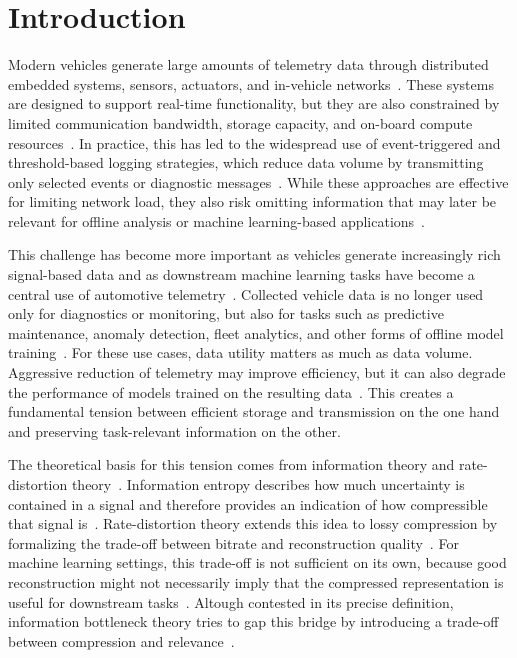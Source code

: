 \chapter{Introduction}
\label{chap:introduction}

Modern vehicles generate large amounts of telemetry data through distributed embedded systems, sensors, actuators, and in-vehicle networks~\cite{Lee2017,Navet2009,MITRE2023}. These systems are designed to support real-time functionality, but they are also constrained by limited communication bandwidth, storage capacity, and on-board compute resources~\cite{Navet2009}. In practice, this has led to the widespread use of event-triggered and threshold-based logging strategies, which reduce data volume by transmitting only selected events or diagnostic messages~\cite{AUTOSAR2022b,Navet2009}. While these approaches are effective for limiting network load, they also risk omitting information that may later be relevant for offline analysis or machine learning-based applications~\cite{Navet2009,EventDrivenDiagPatent}.

This challenge has become more important as vehicles generate increasingly rich signal-based data and as downstream machine learning tasks have become a central use of automotive telemetry~\cite{Bertoncello2021,Samantaray2023,Theissler2021}. Collected vehicle data is no longer used only for diagnostics or monitoring, but also for tasks such as predictive maintenance, anomaly detection, fleet analytics, and other forms of offline model training~\cite{Theissler2021,Oezdemir2024,Brunheroto2022}. For these use cases, data utility matters as much as data volume. Aggressive reduction of telemetry may improve efficiency, but it can also degrade the performance of models trained on the resulting data~\cite{Tirupathi2022,Eichinger2015,Moon2018}. This creates a fundamental tension between efficient storage and transmission on the one hand and preserving task-relevant information on the other.

The theoretical basis for this tension comes from information theory and rate-distortion theory~\cite{Shannon1948,Shannon1949}. Information entropy describes how much uncertainty is contained in a signal and therefore provides an indication of how compressible that signal is~\cite{Shannon1948}. Rate-distortion theory extends this idea to lossy compression by formalizing the trade-off between bitrate and reconstruction quality~\cite{Shannon1949}. For machine learning settings, this trade-off is not sufficient on its own, because good reconstruction might not necessarily imply that the compressed representation is useful for downstream tasks~\cite{Marchioni2024,Cuza2024}. Altough contested in its precise definition, information bottleneck theory tries to gap this bridge by introducing a trade-off between compression and relevance~\cite{Tishby2000}.

